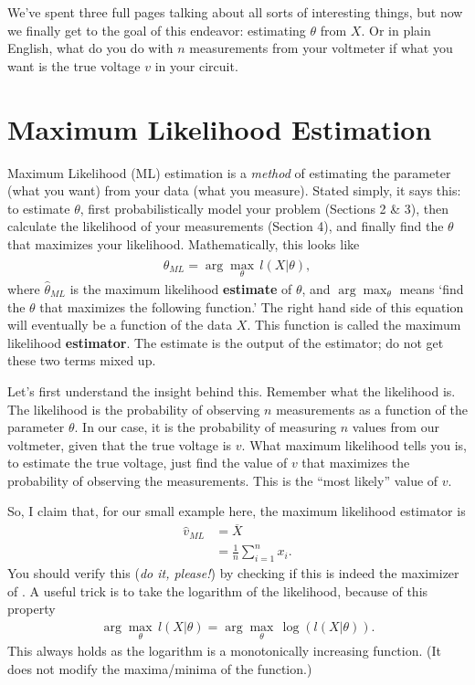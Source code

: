 \documentclass[10pt]{article}
\begin{document}
We've spent three full pages talking about all sorts of interesting things, but now we finally get to the goal of this endeavor: estimating $\theta$ from $X$. Or in plain English, what do you do with $n$ measurements from your voltmeter if what you want is the true voltage $v$ in your circuit.

\section{Maximum Likelihood Estimation}
Maximum Likelihood (ML) estimation is a \emph{method} of estimating the parameter (what you want) from your data (what you measure). Stated simply, it says this: to estimate $\theta$, first probabilistically model your problem (Sections 2 \& 3), then calculate the likelihood of your measurements (Section 4), and finally find the $\theta$ that maximizes your likelihood. Mathematically, this looks like
\begin{align}
 	\widehat{\theta}_{ML} = \arg \max_\theta\, l(X\vert\theta),
 \end{align}
where $\widehat{\theta}_{ML}$ is the maximum likelihood \textbf{estimate} of $\theta$, and $ \arg \max_\theta$ means `find the $\theta$ that maximizes the following function.' The right hand side of this equation will eventually be a function of the data $X$. This function is called the maximum likelihood \textbf{estimator}. The estimate is the output of the estimator; do not get these two terms mixed up.

Let's first understand the insight behind this. Remember what the likelihood is. The likelihood is the probability of observing $n$ measurements as a function of the parameter $\theta$. In our case, it is the probability of measuring $n$ values from our voltmeter, given that the true voltage is $v$. What maximum likelihood tells you is, to estimate the true voltage, just find the value of $v$ that maximizes the probability of observing the measurements. This is the ``most likely'' value of $v$.

So, I claim that, for our small example here, the maximum likelihood estimator is
\begin{align}
	\widehat{v}_{ML} &= \overline{X}\\
					 &= \frac{1}{n}\sum_{i=1}^n x_i.
\end{align}
You should verify this (\emph{do it, please!}) by checking if this is indeed the maximizer of . A useful trick is to take the logarithm of the likelihood, because of this property
\begin{align}
	\arg \max_\theta\, l(X\vert\theta) = \arg \max_\theta\, \log\left(l(X\vert\theta)\right).
\end{align}
This always holds as the logarithm is a monotonically increasing function. (It does not modify the maxima/minima of the function.)
\end{document}
